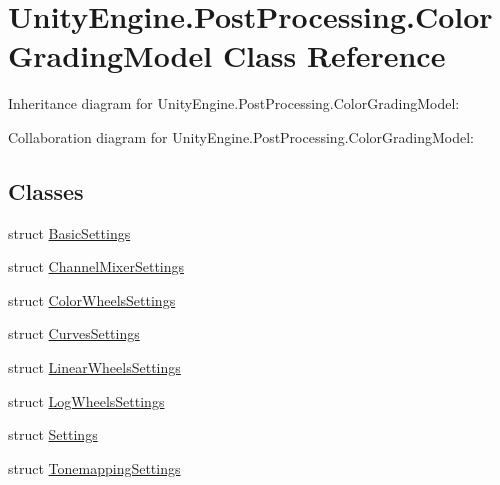 \hypertarget{class_unity_engine_1_1_post_processing_1_1_color_grading_model}{}\section{Unity\+Engine.\+Post\+Processing.\+Color\+Grading\+Model Class Reference}
\label{class_unity_engine_1_1_post_processing_1_1_color_grading_model}


Inheritance diagram for Unity\+Engine.\+Post\+Processing.\+Color\+Grading\+Model\+:


Collaboration diagram for Unity\+Engine.\+Post\+Processing.\+Color\+Grading\+Model\+:
\subsection*{Classes}
\begin{DoxyCompactItemize}
\item 
struct \hyperlink{struct_unity_engine_1_1_post_processing_1_1_color_grading_model_1_1_basic_settings}{Basic\+Settings}
\item 
struct \hyperlink{struct_unity_engine_1_1_post_processing_1_1_color_grading_model_1_1_channel_mixer_settings}{Channel\+Mixer\+Settings}
\item 
struct \hyperlink{struct_unity_engine_1_1_post_processing_1_1_color_grading_model_1_1_color_wheels_settings}{Color\+Wheels\+Settings}
\item 
struct \hyperlink{struct_unity_engine_1_1_post_processing_1_1_color_grading_model_1_1_curves_settings}{Curves\+Settings}
\item 
struct \hyperlink{struct_unity_engine_1_1_post_processing_1_1_color_grading_model_1_1_linear_wheels_settings}{Linear\+Wheels\+Settings}
\item 
struct \hyperlink{struct_unity_engine_1_1_post_processing_1_1_color_grading_model_1_1_log_wheels_settings}{Log\+Wheels\+Settings}
\item 
struct \hyperlink{struct_unity_engine_1_1_post_processing_1_1_color_grading_model_1_1_settings}{Settings}
\item 
struct \hyperlink{struct_unity_engine_1_1_post_processing_1_1_color_grading_model_1_1_tonemapping_settings}{Tonemapping\+Settings}
\end{DoxyCompactItemize}
